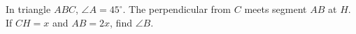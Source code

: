 In triangle $ABC$, $\angle A=45^\circ$. The perpendicular from $C$ meets segment $AB$ at $H$. If $CH=x$ and $AB=2x$, find $\angle B$.
